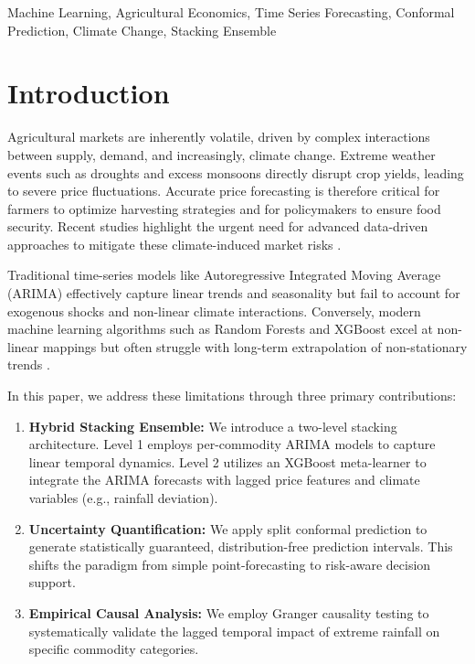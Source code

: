 \documentclass[conference]{IEEEtran}
\begin{document}
\begin{IEEEkeywords}
Machine Learning, Agricultural Economics, Time Series Forecasting, Conformal Prediction, Climate Change, Stacking Ensemble
\end{IEEEkeywords}

\section{Introduction}
\label{sec:introduction}
Agricultural markets are inherently volatile, driven by complex interactions between supply, demand, and increasingly, climate change. Extreme weather events such as droughts and excess monsoons directly disrupt crop yields, leading to severe price fluctuations. Accurate price forecasting is therefore critical for farmers to optimize harvesting strategies and for policymakers to ensure food security. Recent studies highlight the urgent need for advanced data-driven approaches to mitigate these climate-induced market risks \cite{benos2021machine, mishra2023climate}.

Traditional time-series models like Autoregressive Integrated Moving Average (ARIMA) \cite{box1970time} effectively capture linear trends and seasonality but fail to account for exogenous shocks and non-linear climate interactions. Conversely, modern machine learning algorithms such as Random Forests \cite{breiman2001random} and XGBoost \cite{chen2016xgboost} excel at non-linear mappings but often struggle with long-term extrapolation of non-stationary trends \cite{sharma2022machine}. 

In this paper, we address these limitations through three primary contributions:
\begin{enumerate}
    \item \textbf{Hybrid Stacking Ensemble:} We introduce a two-level stacking architecture. Level 1 employs per-commodity ARIMA models to capture linear temporal dynamics. Level 2 utilizes an XGBoost meta-learner to integrate the ARIMA forecasts with lagged price features and climate variables (e.g., rainfall deviation).
    \item \textbf{Uncertainty Quantification:} We apply split conformal prediction \cite{vovk2005algorithmic} to generate statistically guaranteed, distribution-free prediction intervals. This shifts the paradigm from simple point-forecasting to risk-aware decision support.
    \item \textbf{Empirical Causal Analysis:} We employ Granger causality testing \cite{granger1969investigating} to systematically validate the lagged temporal impact of extreme rainfall on specific commodity categories.
\end{enumerate}
\end{document}
